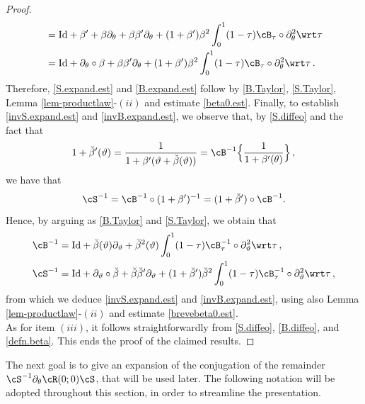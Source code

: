\documentclass[a4paper,reqno,10pt]{article}
\newcommand{\pa}{\partial}
\begin{document}
\begin{proof}
\begin{align}
		& = {\rm Id } + \beta'+\beta \pa_{\theta} + \beta \beta' \pa_{\theta}  + (1+\beta') \beta ^2 \int_{0}^{1} (1-\tau) \cB_{\tau}\circ \pa_{\theta}^2 \wrt\tau \\
		& = {\rm Id} + \pa_{\theta} \circ \beta +\beta\beta'\pa_{\theta} + (1+\beta') \beta ^2 \int_{0}^{1} (1-\tau) \cB_{\tau}\circ \pa_{\theta}^2 \wrt\tau\,.\label{S.Taylor}
	\end{align}
	Therefore, \eqref{S.expand.est} and \eqref{B.expand.est} follow by \eqref{B.Taylor}, \eqref{S.Taylor}, Lemma \ref{lem-productlaw}-$(ii)$ and estimate \eqref{beta0.est}. 
	Finally, to establish \eqref{invS.expand.est} and \eqref{invB.expand.est}, we observe that, by \eqref{S.diffeo} and the fact that
    	\begin{equation}\label{deri.brevebeta}
		1+ \breve{\beta}'(\vartheta)= \frac{1}{1+\beta'(\vartheta +\breve{\beta}(\vartheta))} = \cB^{-1} \Big\{ \frac{1}{1+\beta'(\theta)} \Big\}\,,
	\end{equation}
     we have that
	\begin{equation}
		\cS^{-1} = \cB^{-1} \circ (1+\beta')^{-1} = (1+\breve{\beta}') \circ \cB^{-1}.
	\end{equation}
	Hence, by arguing as \eqref{B.Taylor} and \eqref{S.Taylor}, we obtain that
	\begin{align}
    \cB^{-1} &= {\rm Id} + \breve\beta(\vartheta) \pa_{\vartheta} + \breve\beta^2(\vartheta)  \int_{0}^{1} (1-\tau) \cB_{\tau}^{-1}\circ \pa_{\vartheta}^2 \wrt\tau \,, \\
		\cS^{-1}  & = {\rm Id} + \pa_{\vartheta} \circ \breve\beta + \breve{\beta}\breve{\beta}'\pa_{\vartheta}+ (1+\breve\beta') \breve\beta ^2 \int_{0}^{1} (1-\tau) \cB_{\tau}^{-1}\circ \pa_{\vartheta}^2 \wrt\tau\,,
	\end{align}
	from which we deduce \eqref{invS.expand.est} and \eqref{invB.expand.est}, using also Lemma \ref{lem-productlaw}-$(ii)$ and estimate \eqref{brevebeta0.est}.	
	\\
	As for item $(iii)$, it follows straightforwardly from \eqref{S.diffeo}, \eqref{B.diffeo}, and \eqref{defn.beta}. This ends  the proof of the claimed results.
\end{proof}

The next goal is to give an expansion of the conjugation of the remainder $\cS^{-1} \pa_{\theta}\cR(0;0)\cS$, that will be used later.
The following notation will be adopted throughout this section, in order to streamline the presentation.
\end{document}
